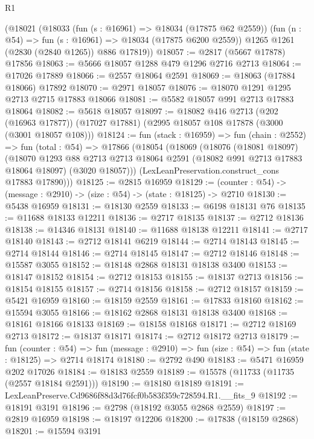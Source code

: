\begin{lexlean}{R1}
\begin{coremodule}
    (@18021
      (@18033
        (fun (s : @16961) => @18034 (@17875 @62 @2559))
        (fun (n : @54) => fun (s : @16961) => @18034 (@17875 @6200 @2559))
        @1265
        @1261
        (@2830 (@2840 @1265))
        @886
        @17819))
@18057 := @2817 (@5667 @17878) @17856
@18063 := @5666 @18057 @1288 @479 @1296 @2716 @2713
@18064 := @17026 @17889
@18066 := @2557 @18064 @2591
@18069 := @18063 (@17884 @18066) @17892
@18070 := @2971 @18057
@18076 := @18070 @1291 @1295 @2713 @2715 @17883 @18066
@18081 := @5582 @18057 @991 @2713 @17883 @18064
@18082 := @5618 @18057
@18097 := @18082
    @416
    @2713
    (@202 (@16963 @17877))
    (@17027 @17881)
    (@2995 @18057 @108 @17878 (@3000 (@3001 @18057 @108)))
@18124 := fun (stack : @16959) =>
  fun (chain : @2552) =>
  fun (total : @54) =>
  @17866
    (@18054
      (@18069
        (@18076
          (@18081 @18097)
          (@18070
            @1293
            @88
            @2713
            @2713
            @18064
            @2591
            (@18082 @991 @2713 @17883 @18064 @18097)
            (@3020 @18057)))
        (LexLeanPreservation.construct_cons @17883 @17890)))
@18125 := @2815 @16959
@18129 := (counter : @54) -> (message : @2910) -> (size : @54) -> (state : @18125) -> @2710
@18130 := @5438 @16959
@18131 := @18130 @2559
@18133 := @6198 @18131 @76
@18135 := @11688 @18133 @12211
@18136 := @2717 @18135
@18137 := @2712 @18136
@18138 := @14346 @18131
@18140 := @11688 @18138 @12211
@18141 := @2717 @18140
@18143 := @2712 @18141 @6219
@18144 := @2714 @18143
@18145 := @2714 @18144
@18146 := @2714 @18145
@18147 := @2712 @18146
@18148 := @15587 @3055
@18152 := @18148 @2868 @18131 @18138 @3400
@18153 := @18147 @18152
@18154 := @2712 @18153
@18155 := @18137 @2713
@18156 := @18154 @18155
@18157 := @2714 @18156
@18158 := @2712 @18157
@18159 := @5421 @16959
@18160 := @18159 @2559
@18161 := @17833 @18160
@18162 := @15594 @3055
@18166 := @18162 @2868 @18131 @18138 @3400
@18168 := @18161 @18166 @18133
@18169 := @18158 @18168
@18171 := @2712 @18169 @2713
@18172 := @18137 @18171
@18174 := @2712 @18172 @2713
@18179 := fun (counter : @54) =>
  fun (message : @2910) => fun (size : @54) => fun (state : @18125) => @2714 @18174
@18180 := @2792 @490
@18183 := @5471 @16959 @202 @17026
@18184 := @18183 @2559
@18189 := @15578 (@11733 (@11735 (@2557 @18184 @2591)))
@18190 := @18180 @18189
@18191 := LexLeanPreserve.Cd9686f88d3d76fcf0b583f359c728594.R1.__fits_9
@18192 := @18191 @3191
@18196 := @2798 (@18192 @3055 @2868 @2559)
@18197 := @2819 @16959
@18198 := @18197 @12206
@18200 := @17838 (@18159 @2868)
@18201 := @15594 @3191

\end{coremodule}
\end{lexlean}
